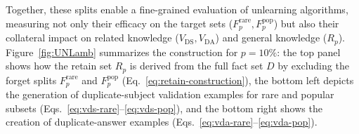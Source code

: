 \documentclass[11pt]{article}
\begin{document}
{Together, these splits enable a fine-grained evaluation of unlearning algorithms, measuring not only their efficacy on the target sets ($F_p^{\text{rare}}, F_p^{\text{pop}}$) but also their collateral impact on related knowledge ($V_{\text{DS}}, V_{\text{DA}}$) and general knowledge ($R_p$). Figure~\ref{fig:UNLamb} summarizes the construction for \(p=10\%\): the top panel shows how the retain set \(R_p\) is derived from the full fact set \(D\) by excluding the forget splits \(F_p^{\text{rare}}\) and \(F_p^{\text{pop}}\) (Eq.~\eqref{eq:retain-construction}), the bottom left depicts the generation of duplicate-subject validation examples for rare and popular subsets (Eqs.~\eqref{eq:vds-rare}--\eqref{eq:vds-pop}), and the bottom right shows the creation of duplicate-answer examples (Eqs.~\eqref{eq:vda-rare}--\eqref{eq:vda-pop}).











}
\end{document}

